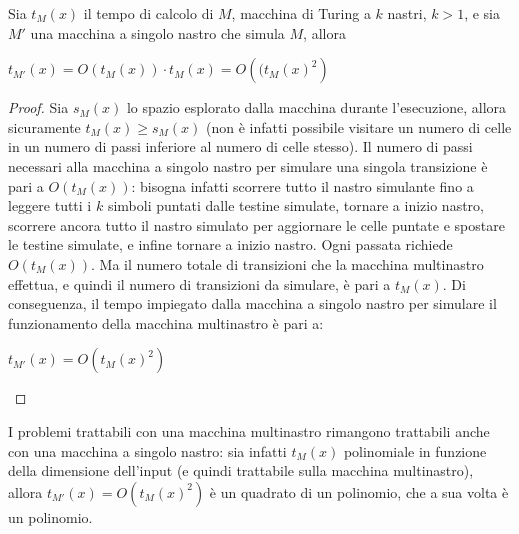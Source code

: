 \begin{thm}
    Sia $t_M (x)$ il tempo di calcolo di $M$, macchina di Turing a $k$ nastri, $k>1$, e sia $M'$ una macchina a singolo nastro che simula $M$, allora 
    \begin{center}
        $t_{M'} (x) = O \left( t_M (x) \right) \cdot t_M (x) = O \left( ({t_M (x)}^2 \right)$
    \end{center}
\end{thm}

\begin{proof}
    Sia $s_M (x)$ lo spazio esplorato dalla macchina durante l'esecuzione, allora sicuramente $t_M (x) \ge s_M (x)$ (non è infatti possibile visitare un numero di celle in un numero di passi inferiore al numero di celle stesso).
    Il numero di passi necessari alla macchina a singolo nastro per simulare una singola transizione è pari a $O(t_M (x))$: bisogna infatti scorrere tutto il nastro simulante fino a leggere tutti i $k$ simboli puntati dalle testine simulate, tornare a inizio nastro, scorrere ancora tutto il nastro simulato per aggiornare le celle puntate e spostare le testine simulate, e infine tornare a inizio nastro. Ogni passata richiede $O(t_M (x))$.
    Ma il numero totale di transizioni che la macchina multinastro effettua, e quindi il numero di transizioni da simulare, è pari a $t_M (x)$. Di conseguenza, il tempo impiegato dalla macchina a singolo nastro per simulare il funzionamento della macchina multinastro è pari a:
    \begin{center}
        $t_{M'} (x) = O \left( {t_M (x)}^2 \right)$ 
    \end{center}
\end{proof}

\begin{rem}
    I problemi trattabili con una macchina multinastro rimangono trattabili anche con una macchina a singolo nastro: sia infatti $t_M (x)$ polinomiale in funzione della dimensione dell'input (e quindi trattabile sulla macchina multinastro), allora $t_{M'} (x) = O \left( {t_M (x)}^2 \right)$ è un quadrato di un polinomio, che a sua volta è un polinomio. 
\end{rem}

